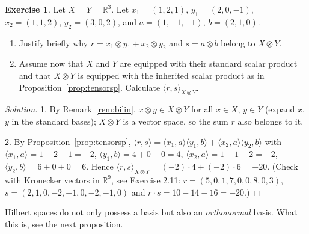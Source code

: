 \documentclass[11pt,a4paper]{article}
\numberwithin{equation}{section}
\newcommand{\R}{\mathbb{R}}
\newcommand{\ip}[2]{\langle #1, #2\rangle}
\theoremstyle{plain}
\theoremstyle{definition}
\newtheorem{exercise}[theorem]{Exercise}
\theoremstyle{plain}
\theoremstyle{definition}
\newenvironment{solution}{\begin{proof}[Solution]}{\end{proof}}
\begin{document}
\begin{exercise}
Let $X=Y=\R^3$. Let $x_1=(1,2,1)$, $y_1=(2,0,-1)$, $x_2=(1,1,2)$, $y_2=(3,0,2)$, and
$a=(1,-1,-1)$, $b=(2,1,0)$.
\begin{enumerate}
\item Justify briefly why $r=x_1\otimes y_1+x_2\otimes y_2$ and $s=a\otimes b$ belong to $X\otimes Y$.
\item Assume now that $X$ and $Y$ are equipped with their standard scalar product and that
$X\otimes Y$ is equipped with the inherited scalar product as in
Proposition~\ref{prop:tensorsp}. Calculate $\ip{r}{s}_{X\otimes Y}$.
\end{enumerate}
\end{exercise}
\begin{solution}
1. By Remark~\ref{rem:bilin}, $x\otimes y\in X\otimes Y$ for all $x\in X$, $y\in Y$
(expand $x$, $y$ in the standard bases); $X\otimes Y$ is a vector space, so the sum
$r$ also belongs to it.

2. By Proposition~\ref{prop:tensorsp},
$\ip{r}{s}=\ip{x_1}{a}\ip{y_1}{b}+\ip{x_2}{a}\ip{y_2}{b}$ with
$\ip{x_1}{a}=1-2-1=-2$, $\ip{y_1}{b}=4+0+0=4$, $\ip{x_2}{a}=1-1-2=-2$, $\ip{y_2}{b}=6+0+0=6$.
Hence $\ip{r}{s}_{X\otimes Y}=(-2)\cdot4+(-2)\cdot6=-20$.
(Check with Kronecker vectors in $\R^9$, see Exercise 2.11:
$r=(5,0,1,7,0,0,8,0,3)$, $s=(2,1,0,-2,-1,0,-2,-1,0)$ and $r\cdot s=10-14-16=-20$.)
\end{solution}

Hilbert spaces do not only possess a basis but also an \emph{orthonormal} basis. What this
is, see the next proposition.
\end{document}
